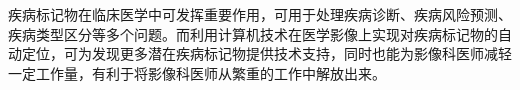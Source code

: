 疾病标记物在临床医学中可发挥重要作用，可用于处理疾病诊断、疾病风险预测、疾病类型区分等多个问题。而利用计算机技术在医学影像上实现对疾病标记物的自动定位，可为发现更多潜在疾病标记物提供技术支持，同时也能为影像科医师减轻一定工作量，有利于将影像科医师从繁重的工作中解放出来。



